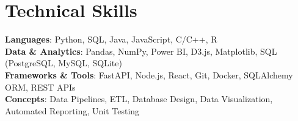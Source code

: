 \documentclass[letterpaper,11pt]{article}
\begin{document}
\section{Technical Skills}
\begin{itemize}[leftmargin=0.15in, label={}]
    \small{\item{
          \textbf{Languages}{: Python, SQL, Java, JavaScript, C/C++, R} \\
          \textbf{Data \& Analytics}{: Pandas, NumPy, Power BI, D3.js, Matplotlib, SQL (PostgreSQL, MySQL, SQLite)} \\
          \textbf{Frameworks \& Tools}{: FastAPI, Node.js, React, Git, Docker, SQLAlchemy ORM, REST APIs} \\
          \textbf{Concepts}{: Data Pipelines, ETL, Database Design, Data Visualization, Automated Reporting, Unit Testing} \\
          }}
\end{itemize}


\end{document}
